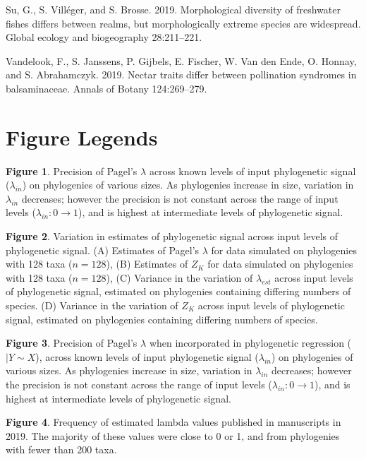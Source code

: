 \documentclass[
]{article}
\begin{document}
\leavevmode\hypertarget{ref-Su2019}{}%
Su, G., S. Villéger, and S. Brosse. 2019. Morphological diversity of
freshwater fishes differs between realms, but morphologically extreme
species are widespread. Global ecology and biogeography 28:211--221.

\leavevmode\hypertarget{ref-Vandelook2019}{}%
Vandelook, F., S. Janssens, P. Gijbels, E. Fischer, W. Van den Ende, O.
Honnay, and S. Abrahamczyk. 2019. Nectar traits differ between
pollination syndromes in balsaminaceae. Annals of Botany 124:269--279.

\newpage

\hypertarget{figure-legends}{%
\section{Figure Legends}\label{figure-legends}}

\textbf{Figure 1}. Precision of Pagel's \(\lambda\) across known levels
of input phylogenetic signal (\(\lambda_{in}\)) on phylogenies of
various sizes. As phylogenies increase in size, variation in
\(\lambda_{in}\) decreases; however the precision is not constant across
the range of input levels (\(\lambda_{in}: 0 \to 1\)), and is highest at
intermediate levels of phylogenetic signal. \hfill\break

\textbf{Figure 2}. Variation in estimates of phylogenetic signal across
input levels of phylogenetic signal. (A) Estimates of Pagel's
\(\lambda\) for data simulated on phylogenies with 128 taxa (\(n=128\)),
(B) Estimates of \(Z_K\) for data simulated on phylogenies with 128 taxa
(\(n=128\)), (C) Variance in the variation of \(\lambda_{est}\) across
input levels of phylogenetic signal, estimated on phylogenies containing
differing numbers of species. (D) Variance in the variation of \(Z_K\)
across input levels of phylogenetic signal, estimated on phylogenies
containing differing numbers of species. \hfill\break

\textbf{Figure 3}. Precision of Pagel's \(\lambda\) when incorporated in
phylogenetic regression (\(|Y\sim X\)), across known levels of input
phylogenetic signal (\(\lambda_{in}\)) on phylogenies of various sizes.
As phylogenies increase in size, variation in \(\lambda_{in}\)
decreases; however the precision is not constant across the range of
input levels (\(\lambda_{in}: 0 \to 1\)), and is highest at intermediate
levels of phylogenetic signal. \hfill\break

\textbf{Figure 4}. Frequency of estimated lambda values published in
manuscripts in 2019. The majority of these values were close to 0 or 1,
and from phylogenies with fewer than 200 taxa.
\end{document}
